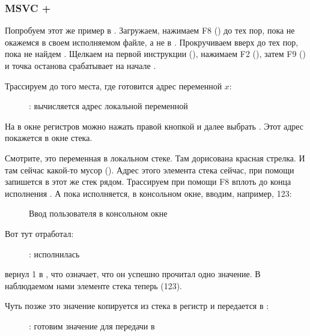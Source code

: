 \clearpage
\subsubsection{MSVC + \olly}
\myindex{\olly}

Попробуем этот же пример в \olly.
Загружаем, нажимаем F8 (\stepover) до тех пор, пока не окажемся в своем исполняемом файле,
а не в .
Прокручиваем вверх до тех пор, пока не найдем \main.
Щелкаем на первой инструкции (), нажимаем F2 (), 
затем F9 () и точка останова срабатывает на начале \main.

Трассируем до того места, где готовится адрес переменной $x$:

\begin{figure}[H]
\centering
{}
\caption{\olly: вычисляется адрес локальной переменной}
\label{fig:scanf_ex1_olly_1}
\end{figure}

На \EAX в окне регистров можно нажать правой кнопкой и далее выбрать .
Этот адрес покажется в окне стека.

Смотрите, это переменная в локальном стеке. Там дорисована красная стрелка.
И там сейчас какой-то мусор ().
Адрес этого элемента стека сейчас, при помощи \PUSH запишется в этот же стек рядом.
Трассируем при помощи F8 вплоть до конца исполнения \scanf.
А пока \scanf исполняется, в консольном окне, вводим, например, 123:

\begin{figure}[H]
\centering
{}
\caption{Ввод пользователя в консольном окне}
\label{fig:scanf_ex1_olly_2}
\end{figure}

\clearpage
Вот тут \scanf отработал:

\begin{figure}[H]
\centering
{}
\caption{\olly: \scanf исполнилась}
\label{fig:scanf_ex1_olly_3}
\end{figure}

\scanf вернул 1 в \EAX, что означает, что он успешно прочитал одно значение.
В наблюдаемом нами элементе стека теперь  (123).

\clearpage
Чуть позже это значение копируется из стека в регистр \ECX и передается в \printf{}:

\begin{figure}[H]
\centering
{}
\caption{\olly: готовим значение для передачи в \printf}
\label{fig:scanf_ex1_olly_4}
\end{figure}
